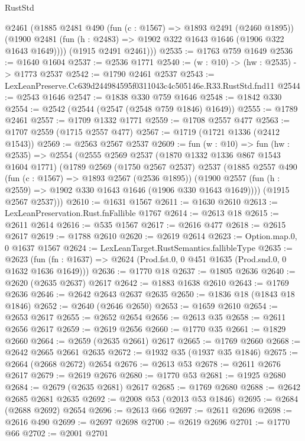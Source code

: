\begin{lexlean}{RustStd}
\begin{coremodule}
        @2461
        (@1885
          @2481
          @490
          (fun (c : @1567) => @1893 @2491 (@2460 @1895))
          (@1900 @2481 (fun (h : @2483) => @1902 @322 @1643 @1646 (@1906 @322 @1643 @1649))))
        (@1915 @2491 @2461)))
@2535 := @1763 @759 @1649
@2536 := @1640 @1604
@2537 := @2536 @1771
@2540 := (w : @10) -> (hw : @2535) -> @1773 @2537
@2542 := @1790 @2461 @2537
@2543 := LexLeanPreserve.Cc639d244984595f0311043c4c505146e.R33.RustStd.fnd11
@2544 := @2543 @1646
@2547 := @1838 @330 @759 @1646
@2548 := @1842 @330
@2554 := @2542 (@2544 (@2547 (@2548 @759 @1846) @1649))
@2555 := @1789 @2461
@2557 := @1709 @1332 @1771
@2559 := @1708 @2557 @477
@2563 := @1707 @2559 (@1715 @2557 @477)
@2567 := @1719 (@1721 @1336 (@2412 @1543))
@2569 := @2563 @2567 @2537
@2609 := fun (w : @10) =>
  fun (hw : @2535) =>
  @2554
    (@2555
      @2569
      @2537
      (@1870 @1332 @1336 @867 @1543 @1604 @1771)
      (@1789
        @2569
        (@1750 @2567 @2537)
        @2537
        (@1885
          @2557
          @490
          (fun (c : @1567) => @1893 @2567 (@2536 @1895))
          (@1900 @2557 (fun (h : @2559) => @1902 @330 @1643 @1646 (@1906 @330 @1643 @1649))))
        (@1915 @2567 @2537)))
@2610 := @1631 @1567
@2611 := @1630 @2610
@2613 := LexLeanPreservation.Rust.fnFallible @1767
@2614 := @2613 @18
@2615 := @2611 @2614
@2616 := @535 @1567
@2617 := @2616 @477
@2618 := @2615 @2617
@2619 := @1788 @2610
@2620 := @2619 @2614
@2623 := Option.map.{0, 0} @1637 @1567
@2624 := LexLeanTarget.RustSemantics.fallibleType
@2635 := @2623
    (fun (fn : @1637) => @2624 (Prod.fst.{0, 0} @451 @1635 (Prod.snd.{0, 0} @1632 @1636 @1649)))
@2636 := @1770 @18
@2637 := @1805 @2636
@2640 := @2620 (@2635 @2637) @2617
@2642 := @1883 @1638 @2610
@2643 := @1769 @2636
@2646 := @2642 @2643 @2637 @2635
@2650 := @1836 @18 (@1843 @18 @1846)
@2652 := @2640 (@2646 @2650)
@2653 := @1659 @2610
@2654 := @2653 @2617
@2655 := @2652 @2654
@2656 := @2613 @35
@2658 := @2611 @2656 @2617
@2659 := @2619 @2656
@2660 := @1770 @35
@2661 := @1829 @2660
@2664 := @2659 (@2635 @2661) @2617
@2665 := @1769 @2660
@2668 := @2642 @2665 @2661 @2635
@2672 := @1932 @35 (@1937 @35 @1846)
@2675 := @2664 (@2668 @2672) @2654
@2676 := @2613 @53
@2678 := @2611 @2676 @2617
@2679 := @2619 @2676
@2680 := @1770 @53
@2681 := @1925 @2680
@2684 := @2679 (@2635 @2681) @2617
@2685 := @1769 @2680
@2688 := @2642 @2685 @2681 @2635
@2692 := @2008 @53 (@2013 @53 @1846)
@2695 := @2684 (@2688 @2692) @2654
@2696 := @2613 @66
@2697 := @2611 @2696
@2698 := @2616 @490
@2699 := @2697 @2698
@2700 := @2619 @2696
@2701 := @1770 @66
@2702 := @2001 @2701

\end{coremodule}
\end{lexlean}
